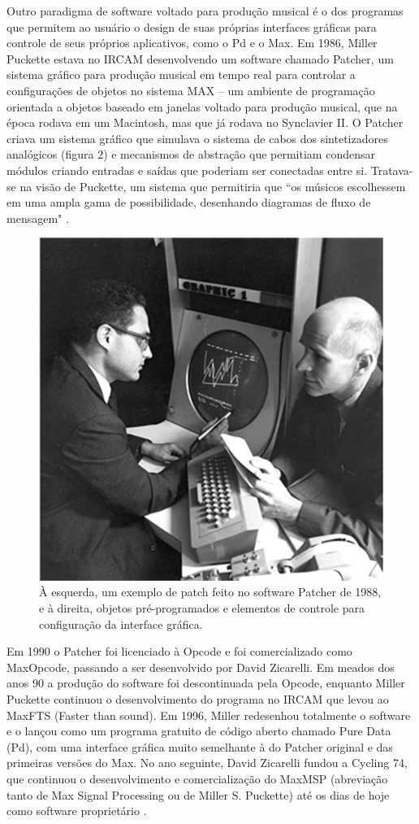 Outro paradigma de software voltado para produção musical é o dos programas que permitem ao usuário o design de suas próprias interfaces gráficas para controle de seus próprios aplicativos, como o Pd e o Max. Em 1986, Miller Puckette estava no IRCAM desenvolvendo um software chamado Patcher, um sistema gráfico para produção musical em tempo real para controlar a configurações de objetos no sistema MAX – um ambiente de programação orientada a objetos baseado em janelas voltado para produção musical, que na época rodava em um Macintosh, mas que já rodava no Synclavier II. O Patcher criava um sistema gráfico que simulava o sistema de cabos dos sintetizadores analógicos (figura 2) e mecanismos de abstração que permitiam condensar módulos criando entradas e saídas que poderiam ser conectadas entre si. Tratava-se na visão de Puckette, um sistema que permitiria que ``os músicos escolhessem em uma ampla gama de possibilidade, desenhando diagramas de fluxo de mensagem" \cite[5]{PucketteMiller}. 

\begin{figure}[ht]
    \caption{\label{patcher}À esquerda, um exemplo de patch feito no software Patcher de 1988, e à direita, objetos pré-programados e elementos de controle para configuração da interface gráfica.}
    \begin{center}
        \includegraphics[width=0.5\linewidth]{pictures/MaxHolmes-251}
    \end{center}
\end{figure}


Em 1990 o Patcher foi licenciado à Opcode e foi comercializado como Max\/Opcode, passando a ser desenvolvido por David Zicarelli. Em meados dos anos 90 a produção do software foi descontinuada pela Opcode, enquanto Miller Puckette continuou o desenvolvimento do programa no IRCAM que levou ao Max\/FTS (Faster than sound). Em 1996, Miller redesenhou totalmente o software e o lançou como um programa gratuito de código aberto chamado Pure Data (Pd), com uma interface gráfica muito semelhante à do Patcher original e das primeiras versões do Max. No ano seguinte, David Zicarelli fundou a Cycling 74, que continuou o desenvolvimento e comercialização do Max\/MSP (abreviação tanto de Max Signal Processing ou de Miller S. Puckette) até os dias de hoje como software proprietário \cite{Cryer2018}.


